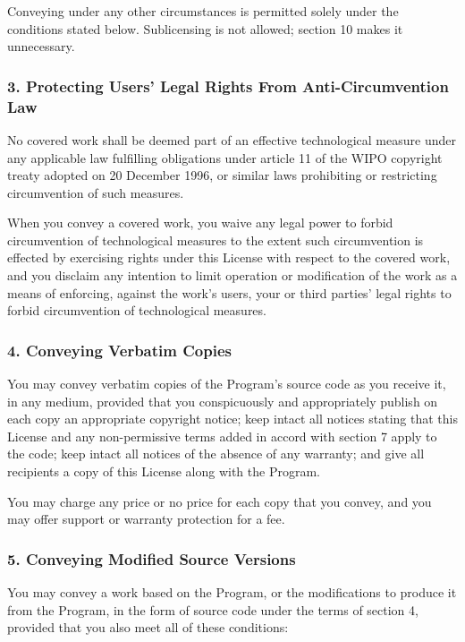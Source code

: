 \documentclass[a4paper, 11pt, twoside]{article}
\begin{document}
Conveying under any other circumstances is permitted solely under the conditions stated below. Sublicensing is not allowed; section 10 makes it unnecessary.

\subsubsection{3. Protecting Users' Legal Rights From Anti-Circumvention Law}

No covered work shall be deemed part of an effective technological measure under any applicable law fulfilling obligations under article 11 of the WIPO copyright treaty adopted on 20 December 1996, or similar laws prohibiting or restricting circumvention of such measures.

When you convey a covered work, you waive any legal power to forbid circumvention of technological measures to the extent such circumvention is effected by exercising rights under this License with respect to the covered work, and you disclaim any intention to limit operation or modification of the work as a means of enforcing, against the work's users, your or third parties' legal rights to forbid circumvention of technological measures.

\subsubsection{4. Conveying Verbatim Copies}

You may convey verbatim copies of the Program's source code as you receive it, in any medium, provided that you conspicuously and appropriately publish on each copy an appropriate copyright notice; keep intact all notices stating that this License and any non-permissive terms added in accord with section 7 apply to the code; keep intact all notices of the absence of any warranty; and give all recipients a copy of this License along with the Program.

You may charge any price or no price for each copy that you convey, and you may offer support or warranty protection for a fee.

\subsubsection{5. Conveying Modified Source Versions}

You may convey a work based on the Program, or the modifications to produce it from the Program, in the form of source code under the terms of section 4, provided that you also meet all of these conditions:
\end{document}
